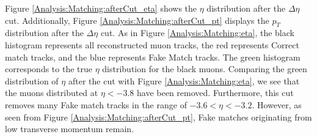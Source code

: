             Figure \ref{Analysis:Matching:afterCut_eta} shows the \(\eta\) distribution after the \(\Delta \eta\) cut. Additionally, Figure \ref{Analysis:Matching:afterCut_pt} displays the \(p_T\) distribution after the \(\Delta \eta\) cut. As in Figure \ref{Analysis:Matching:eta}, the black histogram represents all reconstructed muon tracks, the red represents Correct match tracks, and the blue represents Fake Match tracks. The green histogram corresponds to the true \(\eta\) distribution for the black muons. Comparing the green distribution of \(\eta\) after the cut with Figure \ref{Analysis:Matching:eta}, we see that the muons distributed at \(\eta < -3.8\) have been removed. Furthermore, this cut removes many Fake match tracks in the range of \(-3.6 < \eta < -3.2\). However, as seen from Figure \ref{Analysis:Matching:afterCut_pt}, Fake matches originating from low transverse momentum remain.
